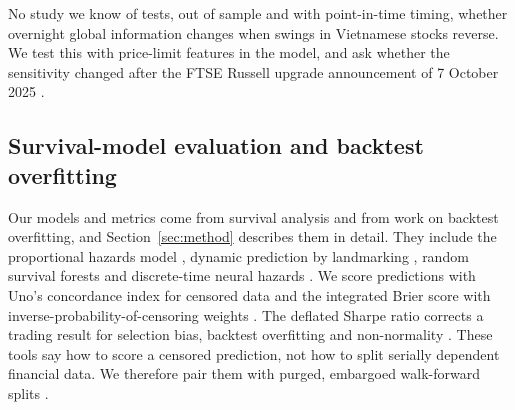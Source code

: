 No study we know of tests, out of sample and with point-in-time timing, whether overnight global
information changes when swings in Vietnamese stocks reverse. We test this with price-limit features
in the model, and ask whether the sensitivity changed after the FTSE Russell upgrade announcement of
7 October 2025 \citep{FTSE2025}.

\subsection{Survival-model evaluation and backtest overfitting}

Our models and metrics come from survival analysis and from work on backtest overfitting, and
Section~\ref{sec:method} describes them in detail. They include the proportional hazards model
\citep{Cox1972}, dynamic prediction by landmarking \citep{vanHouwelingen2007}, random survival forests
\citep{Ishwaran2008} and discrete-time neural hazards \citep{KvammeBorgan2021}. We score predictions
with Uno's concordance index for censored data \citep{Uno2011} and the integrated Brier score with
inverse-probability-of-censoring weights \citep{Graf1999}. The deflated Sharpe ratio corrects a
trading result for selection bias, backtest overfitting and non-normality
\citep{BaileyLopezdePrado2014}. These tools say how to score a censored prediction, not how to split
serially dependent financial data. We therefore pair them with purged, embargoed walk-forward
splits \citep{LopezdePrado2018}.
